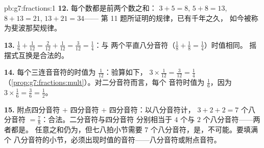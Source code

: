 \begin{solution}{pb:g7:fractions:1}
\textbf{12.} 每个数都是前两个数之和：
$3 + 5 = 8$, $5 + 8 = 13$, $8 + 13 = 21$, $13 + 21 = 34$——
第 11 题所证明的规律，已有千年之久，
如今被称为斐波那契规律。

\textbf{13.} $\frac16 + \frac{1}{12} = \frac{2}{12} +
\frac{1}{12} = \frac{3}{12} = \frac14$：与
两个平直八分音符（$\frac18 + \frac18 = \frac14$）时值相同。
摇摆式互换是合法的。

\textbf{14.} 每个三连音音符的时值为 $\frac{1}{12}$：验算如下，
$3 \times \frac{1}{12} = \frac{3}{12} = \frac14$
（\cref{prop:g7:fractions:mult}）。对二分音符而言，每个
音符时值为 $\frac16$，因为 $3 \times \frac16 = \frac36 = \frac12$。

\textbf{15.} 附点四分音符 $+$ 四分音符 $+$ 四分音符：以八分音符计，
$3 + 2 + 2 = 7$ 个八分音符 $= \frac78$：合法。二分音符与四分音符
分别相当于 $4$ 个与 $2$ 个八分音符——两者都是\emph{}。
任意之和仍为，但七八拍小节需要
$7$ 个八分音符，是，不可能。要填满个
八分音符的小节，必须出现时值的音符——八分音符或附点音符。
\end{solution}
